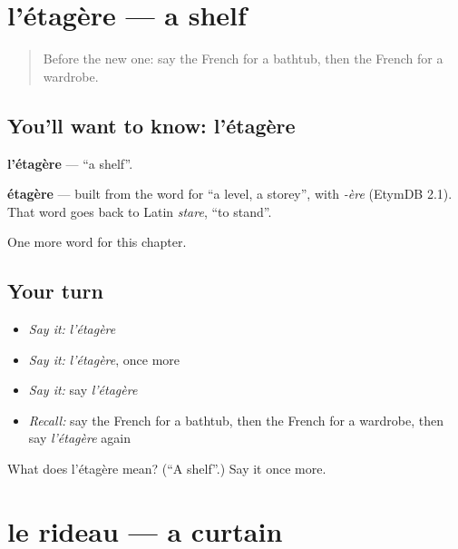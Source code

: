 \section[l'étagère]{l'étagère — a shelf}

\label{lesson:FR-C112-etagere}



\begin{quote}
Before the new one: say the French for a bathtub, then the French for a wardrobe.
\end{quote}

\subsection*{You'll want to know: l'étagère}
\textbf{l'étagère} — \textquotedblleft{}a shelf\textquotedblright{}.

\begin{cousinweb}
\textbf{étagère} — built from the word for \textquotedblleft{}a level, a storey\textquotedblright{}, with \emph{-ère} (EtymDB 2.1). That word goes back to Latin \emph{stare}, \textquotedblleft{}to stand\textquotedblright{}.
\end{cousinweb}

\begin{grammarlens}[title={What you've built}]
One more word for this chapter.
\end{grammarlens}

\subsection*{Your turn}
\begin{itemize}
\raggedright
  \item \emph{Say it:} \emph{l'étagère}
  \item \emph{Say it:} \emph{l'étagère}, once more
  \item \emph{Say it:} say \emph{l'étagère}
  \item \emph{Recall:} say the French for a bathtub, then the French for a wardrobe, then say \emph{l'étagère} again
\end{itemize}

\begin{tcolorbox}[breakable,colback=teal!4,colframe=teal!35!black,title={Before you move on}]
What does l'étagère mean? (\textquotedblleft{}A shelf\textquotedblright{}.) Say it once more.
\end{tcolorbox}
\section[le rideau]{le rideau — a curtain}

